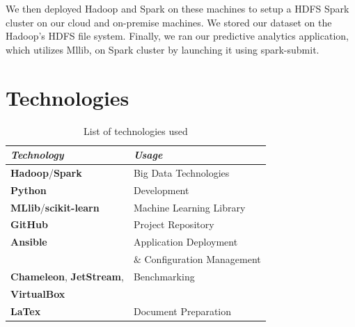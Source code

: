 \documentclass[9pt,twocolumn,twoside]{../../styles/osajnl}
\begin{document}
We then deployed Hadoop and Spark on these machines to setup a HDFS Spark cluster on our cloud and on-premise machines. We stored our dataset on the Hadoop’s HDFS file system. Finally, we ran our predictive analytics application, which utilizes Mllib, on Spark cluster by launching it using spark-submit.

\section{Technologies}
\begin{table}[h!]
\centering
 \begin{tabular}[width=\linewidth]{|l l|}
 \hline
 \textit{Technology} & \textit{Usage}  \\  \hline
 \hline 
 \textbf{Hadoop}\cite{www-hadoop}/\textbf{Spark} \cite{www-spark} & Big Data Technologies  \\
 \hline
 \textbf{Python}\cite{www-python} & Development \\
  \hline
 \textbf{MLlib}\cite{www-mllib}/\textbf{scikit-learn}\cite{www-sklearn} & Machine Learning Library \\
 \hline
 \textbf{GitHub}\cite{www-github} & Project Repository \\
 \hline
 \textbf{Ansible}\cite{www-ansible} & Application Deployment \\ & $\&$ Configuration Management \\
 \hline
 \textbf{Chameleon}\cite{www-chameleon}, \textbf{JetStream}\cite{www-jetstream}, & Benchmarking \\
 \textbf{VirtualBox}\cite{www-vm} &\\
 \hline
 \textbf{LaTex} \cite{www-latex} & Document Preparation \\
 \hline
\end{tabular}
\caption{List of technologies used}
\label{table:techlist}
\end{table}
\end{document}

